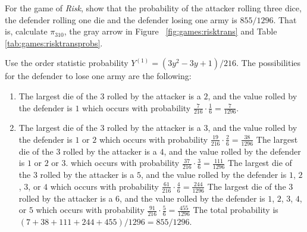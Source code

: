 \documentclass[12pt]{article}
\begin{document}
\begin{exercise}
    For the game of \emph{Risk}, show that the probability of the
    attacker rolling three dice, the defender rolling one die and the
    defender losing one army is \( 855/1296 \).  That is, calculate \(
    \pi_{310} \), the gray arrow in Figure~%
    \ref{fig:games:risktrans} and Table~%
    \ref{tab:games:risktransprobs}.
\end{exercise}
\begin{solution}
    Use the order statistic probability \( Y^{(1)} = (3y^2 - 3 y + 1)/216
    \).  The possibilities for the defender to lose one army are the
    following:
    \begin{enumerate}[label=(\alph*)]
    \item
        The largest die of the \( 3 \) rolled by the attacker is a \( 2 \),
        and the value rolled by the defender is \( 1 \) which occurs
        with probability \( \frac{7}{216} \cdot \frac{1}{6} = \frac{7}{1296}
        \).
    \item
        The largest die of the \( 3 \) rolled by the attacker is a \( 3 \),
        and the value rolled by the defender is \( 1 \) or \( 2 \) which
        occurs with probability \( \frac{19}{216} \cdot \frac{2}{6} =
        \frac{38}{1296} \) The largest die of the \( 3 \) rolled by the
        attacker is a \( 4 \), and the value rolled by the defender is \(
        1 \) or \( 2 \) or \( 3 \).  which occurs with probability \(
        \frac{37}{216} \cdot \frac{3}{6} = \frac{111}{1296} \) The
        largest die of the \( 3 \) rolled by the attacker is a \( 5 \),
        and the value rolled by the defender is \( 1 \), \( 2 \), \( 3 \),
        or \( 4 \) which occurs with probability \( \frac{61}{216} \cdot
        \frac{4}{6} = \frac{244}{1296} \) The largest die of the \( 3 \)
        rolled by the attacker is a \( 6 \), and the value rolled by the
        defender is \( 1 \), \( 2 \), \( 3 \), \( 4 \), or \( 5 \) which
        occurs with probability \( \frac{91}{216} \cdot \frac{5} {6} =
        \frac{455}{1296} \) The total probability is \( (7 + 38 + 111 +
        244 + 455)/1296 = 855/1296 \).
\end{enumerate}
\end{solution}
\end{document}
